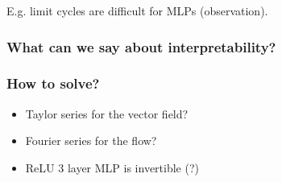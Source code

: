 \documentclass{article} %
\theoremstyle{definition} \newtheorem{definition}{Definition}
\theoremstyle{remark} \newtheorem{remark}{Remark}
\begin{document}
E.g. limit cycles are difficult for MLPs (observation).
\citep{hwang2019lc,hwang2020lc}

\subsubsection{What can we say about interpretability?}


\subsubsection{How to solve?}
\begin{itemize}
\item Taylor series for the vector field?
\item Fourier series for the flow?
\item ReLU 3 layer MLP is invertible (?)
\end{itemize}



\newpage


\end{document}
